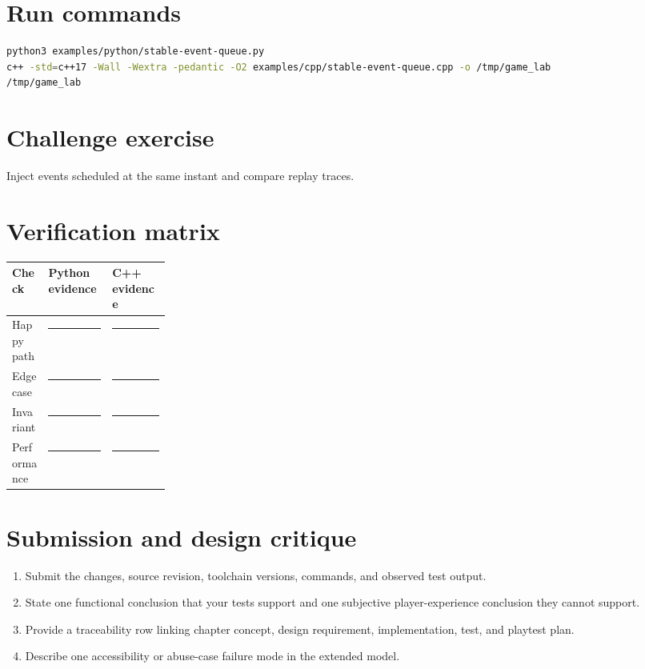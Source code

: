 \documentclass[11pt]{article}
\begin{document}
\section{Run commands}
\begin{lstlisting}[language=bash]
python3 examples/python/stable-event-queue.py
c++ -std=c++17 -Wall -Wextra -pedantic -O2 examples/cpp/stable-event-queue.cpp -o /tmp/game_lab
/tmp/game_lab
\end{lstlisting}

\section{Challenge exercise}
Inject events scheduled at the same instant and compare replay traces.


\section{Verification matrix}
\begin{tabularx}{\linewidth}{@{}p{0.23\linewidth}X X@{}}\toprule Check & Python evidence & C++ evidence\\\midrule
Happy path & \rule{0.85\linewidth}{0.4pt} & \rule{0.85\linewidth}{0.4pt}\\[0.35cm]
Edge case & \rule{0.85\linewidth}{0.4pt} & \rule{0.85\linewidth}{0.4pt}\\[0.35cm]
Invariant & \rule{0.85\linewidth}{0.4pt} & \rule{0.85\linewidth}{0.4pt}\\[0.35cm]
Performance & \rule{0.85\linewidth}{0.4pt} & \rule{0.85\linewidth}{0.4pt}\\\bottomrule\end{tabularx}

\section{Submission and design critique}
\begin{enumerate}
\item Submit the changes, source revision, toolchain versions, commands, and observed test output.
\item State one functional conclusion that your tests support and one subjective player-experience conclusion they cannot support.
\item Provide a traceability row linking chapter concept, design requirement, implementation, test, and playtest plan.
\item Describe one accessibility or abuse-case failure mode in the extended model.
\end{enumerate}
\end{document}
